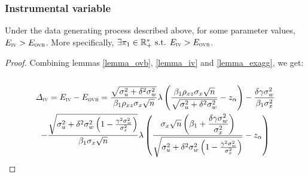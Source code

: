 \documentclass[a4paper, 11pt]{report}
\begin{document}
			
				\subsubsection{Instrumental variable}
			
            				\begin{proposition}\label{proof_trade_off_iv}
            					Under the data generating process described above, for some parameter values, $E_{\textsc{iv}} > E_{\textsc{ovb}}$. More specifically, $\exists \pi_{1} \in \mathbb{R}_{+}^{*} \text{ s.t. } E_{\textsc{iv}} > E_{\textsc{ovb}}$.
            				\end{proposition}
            				
            				\begin{proof}
            				
            				Combining lemmas \ref{lemma_ovb}, \ref{lemma_iv} and \ref{lemma_exagg}, we get:
            				~
                                		\begin{multline*}
                                			\varDelta_{\textsc{iv}} = E_{\textsc{iv}} - E_{\textsc{ovb}} = 
                                				\dfrac{\sqrt{\sigma_{u}^{2} +  \delta^{2} \sigma_{w}^{2}}}{\beta_{1}\rho_{xz} \sigma_{x}\sqrt{n}}
                                					 \lambda \left( \dfrac{\beta_{1}\rho_{xz} \sigma_{x}\sqrt{n}}{\sqrt{\sigma_{u}^{2} +  \delta^{2} \sigma_{w}^{2} }} - z_{\alpha} \right) - 
                                				\dfrac{\delta \gamma \sigma_{w}^{2}}{\beta_{1}\sigma_{x}^{2}} \\
                                				- \dfrac{\sqrt{ \sigma_{u}^{2} +  \delta^{2} \sigma_{w}^{2} \left(1 - \frac{\gamma^{2}\sigma_{w}^{2}}{\sigma_{x}^{2}} \right)}}{\beta_{1} \sigma_{x} \sqrt{n}}
                                				 \lambda \left( \dfrac{ \sigma_{x}\sqrt{n} \left( \beta_{1} + \dfrac{\delta \gamma \sigma_{w}^{2}}{\sigma_{x}^{2}} \right)  }{\sqrt{\sigma_{u}^{2} +  \delta^{2} \sigma_{w}^{2} \left(1 - \frac{\gamma^{2}\sigma_{w}^{2}}{\sigma_{x}^{2}} \right)}} - z_{\alpha} \right)
                                		\end{multline*}
            		                    				

\end{proof}
\end{document}
